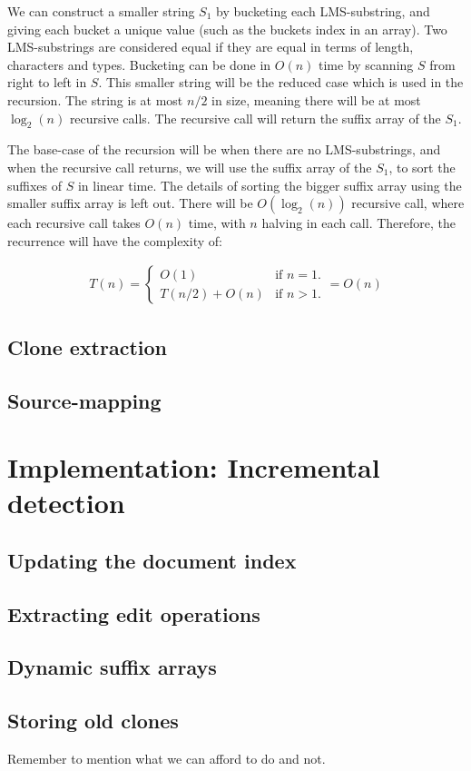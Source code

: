 We can construct a smaller string $S_1$ by bucketing each LMS-substring, and giving each
bucket a unique value (such as the buckets index in an array). Two LMS-substrings are
considered equal if they are equal in terms of length, characters and types. Bucketing can
be done in $O(n)$ time by scanning $S$ from right to left in $S$. This smaller
string will be the reduced case which is used in the recursion. The string is at most $n /
2$ in size, meaning there will be at most $\log_2(n)$ recursive calls. The recursive call
will return the suffix array of the $S_1$.

The base-case of the recursion will be when there are no LMS-substrings, and when the
recursive call returns, we will use the suffix array of the $S_1$, to sort the suffixes of
$S$ in linear time. The details of sorting the bigger suffix array using the smaller
suffix array is left out. There will be $O(\log_2(n))$ recursive call, where each
recursive call takes $O(n)$ time, with $n$ halving in each call. Therefore, the recurrence
will have the complexity of:

\begin{gather*}
    T(n) =
\begin{cases}
    O(1) & \text{if } n = 1. \\
    T(n / 2) + O(n) & \text{if } n > 1.
\end{cases}
= O(n)
\end{gather*}

\section{Clone extraction}

\section{Source-mapping}

\chapter{Implementation: Incremental detection}

\section{Updating the document index}

\section{Extracting edit operations}

\section{Dynamic suffix arrays}

\section{Storing old clones}


Remember to mention what we can afford to do and not.
